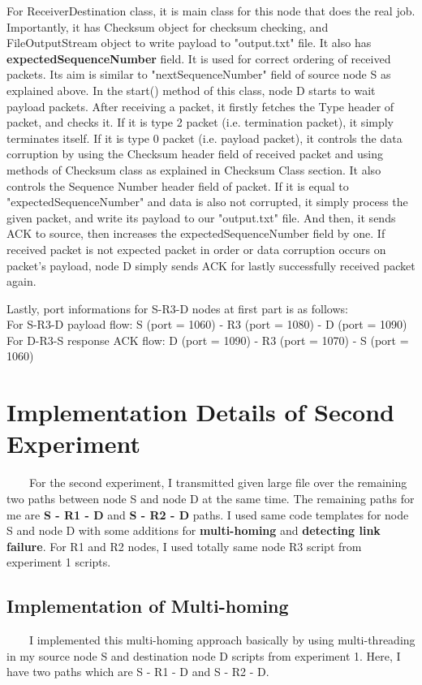 \documentclass[12pt]{article}
\begin{document}
For ReceiverDestination class, it is main class for this node that does the real job. Importantly, it has Checksum object for checksum checking, and FileOutputStream object to write payload to "output.txt" file. It also has \textbf{expectedSequenceNumber} field. It is used for correct ordering of received packets. Its aim is similar to "nextSequenceNumber" field of source node S as explained above. In the start() method of this class, node D starts to wait payload packets. After receiving a packet, it firstly fetches the Type header of packet, and checks it. If it is type 2 packet (i.e. termination packet), it simply terminates itself. If it is type 0 packet (i.e. payload packet), it controls the data corruption by using the Checksum header field of received packet and using methods of Checksum class as explained in Checksum Class section. It also controls the Sequence Number header field of packet. If it is equal to "expectedSequenceNumber" and data is also not corrupted, it simply process the given packet, and write its payload to our "output.txt" file. And then, it sends ACK to source, then increases the expectedSequenceNumber field by one. If received packet is not expected packet in order or data corruption occurs on packet's payload, node D simply sends ACK for lastly successfully received packet again.

Lastly, port informations for S-R3-D nodes at first part is as follows: \\
For S-R3-D payload flow: S (port = 1060) - R3 (port = 1080) - D (port = 1090) \\
For D-R3-S response ACK flow: D (port = 1090) - R3 (port = 1070) - S (port = 1060) \\



\section{Implementation Details of Second Experiment}

\ \ \ \ For the second experiment, I transmitted given large file over the remaining two paths between node S and node D at the same time. The remaining paths for me are \textbf{S - R1 - D} and \textbf{S - R2 - D} paths. I used same code templates for node S and node D with some additions for \textbf{multi-homing} and \textbf{detecting link failure}. For R1 and R2 nodes, I used totally same node R3 script from experiment 1 scripts.


\subsection{Implementation of Multi-homing} 
\ \ \ \ I implemented this multi-homing approach basically by using multi-threading in my source node S and destination node D scripts from experiment 1. Here, I have two paths which are S - R1 - D and S - R2 - D. 
\end{document}
